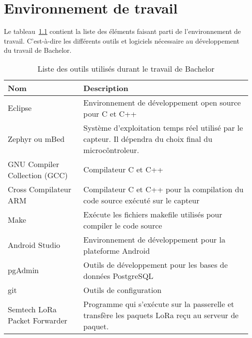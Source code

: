 \chapter{Environnement de travail}

Le tableau~\ref{tab:env_travail} contient la liste des éléments faisant parti de l’environnement de travail. C’est-à-dire les différents outils et logiciels nécessaire au développement du travail de Bachelor.

\begin{table}[htb]
\caption[Environnement de travail]{Liste des outils utilisés durant le travail de Bachelor}
\label{tab:env_travail}
\centering
\begin{tabular}{lp{8cm}}
\toprule
Nom & Description \\
\midrule
Eclipse &	Environnement de développement open source pour C et C++\\
Zephyr ou mBed & Système d’exploitation temps réel utilisé par le capteur. Il dépendra du choix final du microcôntroleur.\\
GNU Compiler Collection (GCC) & Compilateur C et C++\\
Cross Compilateur ARM & Compilateur C et C++ pour la compilation du code source exécuté sur le capteur\\
Make & Exécute les fichiers makefile utilisés pour compiler le code source\\
Android Studio & Environnement de développement pour la plateforme Android\\
pgAdmin & Outils de développement pour les bases de données PostgreSQL\\
git	 & Outils de configuration\\
Semtech LoRa Packet Forwarder & Programme qui s’exécute sur la passerelle et transfère les paquets LoRa reçu au serveur de paquet. \\
\bottomrule 
\end{tabular}
\end{table}